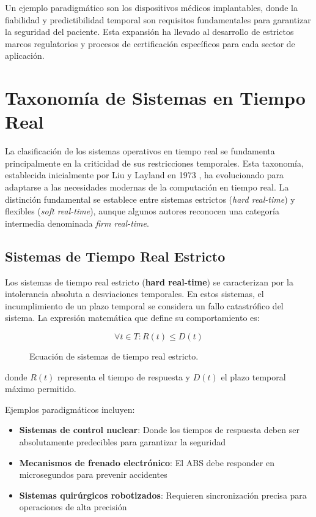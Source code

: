 Un ejemplo paradigmático son los dispositivos médicos implantables, donde la fiabilidad y predictibilidad temporal son requisitos fundamentales para garantizar la seguridad del paciente. Esta expansión ha llevado al desarrollo de estrictos marcos regulatorios y procesos de certificación específicos para cada sector de aplicación.

\newpage
\section{Taxonomía de Sistemas en Tiempo Real}
    La clasificación de los sistemas operativos en tiempo real se fundamenta principalmente en la criticidad de sus restricciones temporales. Esta taxonomía, establecida inicialmente por Liu y Layland en 1973 \cite{Siewert_Pratt_2016}, ha evolucionado para adaptarse a las necesidades modernas de la computación en tiempo real. La distinción fundamental se establece entre sistemas estrictos (\textit{hard real-time}) y flexibles (\textit{soft real-time}), aunque algunos autores reconocen una categoría intermedia denominada \textit{firm real-time}.

    \subsection{Sistemas de Tiempo Real Estricto}
        Los sistemas de tiempo real estricto (\textbf{hard real-time}) se caracterizan por la intolerancia absoluta a desviaciones temporales. En estos sistemas, el incumplimiento de un plazo temporal se considera un fallo catastrófico del sistema. La expresión matemática que define su comportamiento es:



        \begin{figure}[h!]
            \centering
            \begin{equation}
                \forall t \in T: R(t) \leq D(t)
            \end{equation}
            \caption{Ecuación de sistemas de tiempo real estricto.}
            \label{fig:hard_real_time_equation}
        \end{figure}

        donde $R(t)$ representa el tiempo de respuesta y $D(t)$ el plazo temporal máximo permitido.

        Ejemplos paradigmáticos incluyen:
        \begin{itemize}
            \item \textbf{Sistemas de control nuclear}: Donde los tiempos de respuesta deben ser absolutamente predecibles para garantizar la seguridad
            \item \textbf{Mecanismos de frenado electrónico}: El ABS debe responder en microsegundos para prevenir accidentes
            \item \textbf{Sistemas quirúrgicos robotizados}: Requieren sincronización precisa para operaciones de alta precisión
        \end{itemize}

